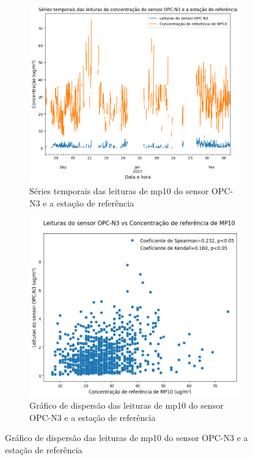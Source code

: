 \begin{figure}[h]
    \centering
    \caption{Séries temporais e gráficos de dispersão das medições de \acrshort{mp10}}
    \begin{subfigure}{0.495\textwidth}
        \includegraphics[width=\textwidth]{chapters/3-RESULTADOS CAMPO/Figuras/pm10-reference-time-series.png}
        \caption{Séries temporais das leituras de \acrshort{mp10} do sensor OPC-N3 e a estação de referência}
        \label{fig:data-pm10-reference-time-series}
    \end{subfigure}
    \hfill
    \begin{subfigure}{0.495\textwidth}
        \includegraphics[width=\textwidth]{chapters/3-RESULTADOS CAMPO/Figuras/pm10-reference-correlation.png}
        \caption{Gráfico de dispersão das leituras de \acrshort{mp10} do sensor OPC-N3 e a estação de referência}
        \label{fig:data-pm10-reference-corr}
    \end{subfigure}
\end{figure}

